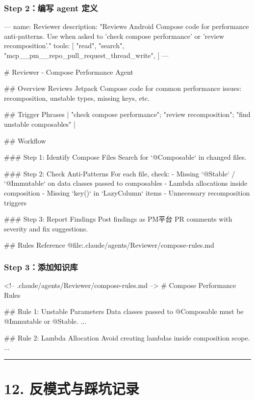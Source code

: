 \subsubsection{Step 2：编写 agent 定义}

\begin{codeblock}
---
name: Reviewer
description: "Reviews Android Compose code for performance anti-patterns.
              Use when asked to 'check compose performance' or
              'review recomposition'."
tools:
  [
    "read",
    "search",
    "mcp__pm__repo_pull_request_thread_write",
  ]
---

# Reviewer - Compose Performance Agent

## Overview
Reviews Jetpack Compose code for common performance issues:
recomposition, unstable types, missing keys, etc.

## Trigger Phrases
| "check compose performance"; "review recomposition"; "find unstable composables" |

## Workflow

### Step 1: Identify Compose Files
Search for `@Composable` in changed files.

### Step 2: Check Anti-Patterns
For each file, check:
- Missing `@Stable` / `@Immutable` on data classes passed to composables
- Lambda allocations inside composition
- Missing `key()` in `LazyColumn` items
- Unnecessary recomposition triggers

### Step 3: Report Findings
Post findings as PM平台 PR comments with severity and fix suggestions.

## Rules Reference
@file:.claude/agents/Reviewer/compose-rules.md
\end{codeblock}

\subsubsection{Step 3：添加知识库}

\begin{codeblock}
<!-- .claude/agents/Reviewer/compose-rules.md -->
# Compose Performance Rules

## Rule 1: Unstable Parameters
Data classes passed to @Composable must be @Immutable or @Stable.
...

## Rule 2: Lambda Allocation
Avoid creating lambdas inside composition scope.
...
\end{codeblock}

\bigskip\hrule\bigskip

\section{12. 反模式与踩坑记录}

